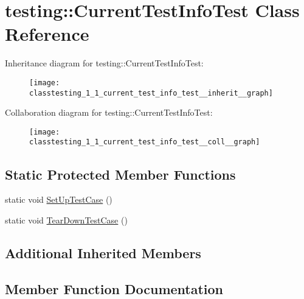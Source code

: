 \hypertarget{classtesting_1_1_current_test_info_test}{}\section{testing\+:\+:Current\+Test\+Info\+Test Class Reference}
\label{classtesting_1_1_current_test_info_test}


Inheritance diagram for testing\+:\+:Current\+Test\+Info\+Test\+:
\nopagebreak
\begin{figure}[H]
\begin{center}
\leavevmode
\texttt{[image: classtesting\_1\_1\_current\_test\_info\_test\_\_inherit\_\_graph]}
\end{center}
\end{figure}


Collaboration diagram for testing\+:\+:Current\+Test\+Info\+Test\+:
\nopagebreak
\begin{figure}[H]
\begin{center}
\leavevmode
\texttt{[image: classtesting\_1\_1\_current\_test\_info\_test\_\_coll\_\_graph]}
\end{center}
\end{figure}
\subsection*{Static Protected Member Functions}
\begin{DoxyCompactItemize}
\item 
static void \hyperlink{classtesting_1_1_current_test_info_test_a61bad7ce29923afd464daf9684b6269e}{Set\+Up\+Test\+Case} ()
\item 
static void \hyperlink{classtesting_1_1_current_test_info_test_a9a80a5a3e6e70c619870c2ae9df892a6}{Tear\+Down\+Test\+Case} ()
\end{DoxyCompactItemize}
\subsection*{Additional Inherited Members}


\subsection{Member Function Documentation}
